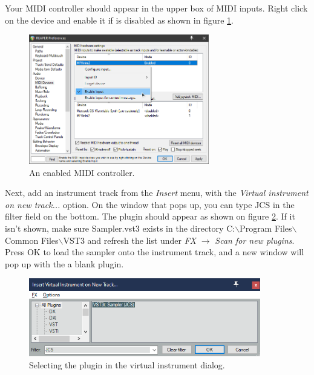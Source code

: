 \documentclass[12pt, a4paper, hidelinks]{article}
\begin{document}
	Your MIDI controller should appear in the upper box of MIDI inputs. Right click on the device and enable it if is disabled as shown in figure \ref{fig:udevon}.
	\begin{figure}[h]
		\centering
		\includegraphics[width=0.7\textwidth]{u/dev_on.png}
		\caption{An enabled MIDI controller.}
		\label{fig:udevon}
	\end{figure}
	
	Next, add an instrument track from the \textit{Insert} menu, with the \textit{Virtual instrument on new track...} option. On the window that pops up, you can type JCS in the filter field on the bottom. The plugin should appear as shown on figure \ref{fig:load}. If it isn't shown, make sure Sampler.vst3 exists in the directory C:$\backslash$Program Files$\backslash$Common Files$\backslash$VST3 and refresh the list under \textit{FX} $\rightarrow$ \textit{Scan for new plugins}. Press OK to load the sampler onto the instrument track, and a new window will pop up with the a blank plugin.
	
	\begin{figure}[h]
		\centering
		\includegraphics[width=0.9\textwidth]{u/load.png}
		\caption{Selecting the plugin in the virtual instrument dialog.}
		\label{fig:load}
	\end{figure}
	
\end{document}
